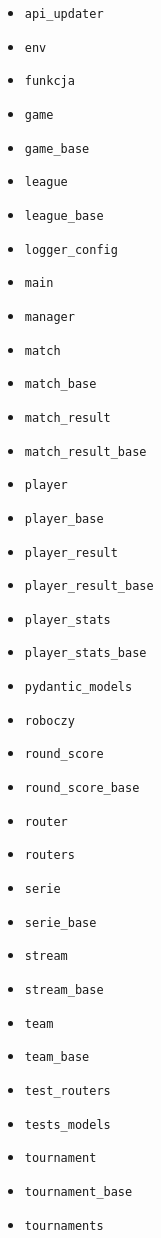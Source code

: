 \documentclass[11pt,a4paper]{article}
\begin{document}
\begin{itemize}
    \item \texttt{api\_updater}
    \item \texttt{env}
    \item \texttt{funkcja}
    \item \texttt{game}
    \item \texttt{game\_base}
    \item \texttt{league}
    \item \texttt{league\_base}
    \item \texttt{logger\_config}
    \item \texttt{main}
    \item \texttt{manager}
    \item \texttt{match}
    \item \texttt{match\_base}
    \item \texttt{match\_result}
    \item \texttt{match\_result\_base}
    \item \texttt{player}
    \item \texttt{player\_base}
    \item \texttt{player\_result}
    \item \texttt{player\_result\_base}
    \item \texttt{player\_stats}
    \item \texttt{player\_stats\_base}
    \item \texttt{pydantic\_models}
    \item \texttt{roboczy}
    \item \texttt{round\_score}
    \item \texttt{round\_score\_base}
    \item \texttt{router}
    \item \texttt{routers}
    \item \texttt{serie}
    \item \texttt{serie\_base}
    \item \texttt{stream}
    \item \texttt{stream\_base}
    \item \texttt{team}
    \item \texttt{team\_base}
    \item \texttt{test\_routers}
    \item \texttt{tests\_models}
    \item \texttt{tournament}
    \item \texttt{tournament\_base}
    \item \texttt{tournaments}
\end{itemize}
\end{document}
